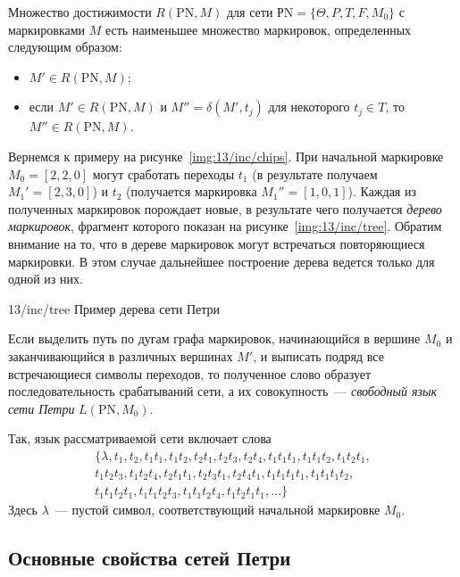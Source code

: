 Множество достижимости ${R(\text{PN}, M)}$ для сети ${\text{РN} = \{ \Theta, P, T, F, M_0 \}}$ с маркировками $M$ есть наименьшее множество маркировок, определенных следующим образом:

\begin{itemize}
    \item ${M'\in R(\text{PN}, M)}$;
    \item если ${M'\in R(\text{PN}, M)}$ и $M'' = \delta(M', t_j)$ для некоторого ${t_j\in T}$, то $M''\in R(\text{PN}, M)$.
\end{itemize}

Вернемся к примеру на рисунке~\ref{img:13/inc/chips}. При начальной маркировке ${M_0 = [2, 2, 0]}$ могут сработать переходы $t_1$ (в результате получаем ${M_1' = [2, 3, 0]}$) и $t_2$ (получается маркировка ${M_1'' = [1, 0, 1]}$). Каждая из полученных маркировок порождает новые, в результате чего получается \textit{дерево маркировок}, фрагмент которого показан на рисунке~\ref{img:13/inc/tree}. Обратим внимание на то, что в дереве маркировок могут встречаться повторяющиеся маркировки. В этом случае дальнейшее построение дерева ведется только для одной из них.

\image
{\textwidth}
{13/inc/tree}
{Пример дерева сети Петри}

Если выделить путь по дугам графа маркировок, начинающийся в вершине $M_0$ и заканчивающийся в различных вершинах $M'$, и выписать подряд все встречающиеся символы переходов, то полученное слово образует последовательность срабатываний сети, а их совокупность~--- \textit{свободный язык сети Петри} ${L(\text{PN}, M_0)}$.

Так, язык рассматриваемой сети включает слова
%
\begin{equation*}
    \begin{aligned}
        \{\lambda, t_1, t_2, t_1t_1, t_1t_2, t_2t_1, t_2t_3, t_2t_4, t_1t_1t_1, t_1t_1t_2, t_1t_2t_1, \\ t_1t_2t_3, t_1t_2t_4, t_2t_1t_1, t_2t_3t_1, t_2t_4t_1, t_1t_1t_1t_1, t_1t_1t_1t_2,\\ t_1t_1t_2t_1, t_1t_1t_2t_3, t_1t_1t_2t_4, t_1t_2t_1t_1, \dots \}
    \end{aligned}
\end{equation*}
%
Здесь $\lambda$~--- пустой символ, соответствующий начальной маркировке $M_0$.

\subsection{Основные свойства сетей Петри}

